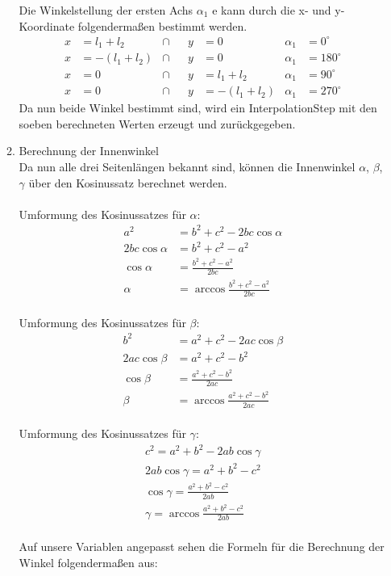 \begin{itemize}
\begin{enumerate}
Die Winkelstellung der ersten Achs $\alpha_1$ e kann durch die x- und y-Koordinate folgendermaßen bestimmt werden.
\begin{align*}
x & = l_1+l_2 &\cap && y & = 0 & \alpha_1 & = 0^\circ \\
x & = -(l_1+l_2) &\cap && y & = 0 & \alpha_1 & = 180^\circ \\ 
x & = 0 &\cap && y & = l_1+l_2 & \alpha_1 & = 90^\circ \\
x & = 0 &\cap && y & = -(l_1+l_2) & \alpha_1 & = 270^\circ
\end{align*}
Da nun beide Winkel bestimmt sind, wird ein InterpolationStep mit den soeben berechneten Werten erzeugt und zurückgegeben.
\item Berechnung der Innenwinkel\\
Da nun alle drei Seitenlängen bekannt sind, können die Innenwinkel $\alpha$, $\beta$, $\gamma$ über den Kosinussatz berechnet werden.\\
\\
Umformung des Kosinussatzes für $\alpha$:
\begin{align*}
a^2 & = b^2 + c^2 - 2bc \cos \alpha \\
2bc \cos \alpha & = b^2 + c^2 - a^2 \\
\cos \alpha & = \frac{b^2 + c^2 - a^2}{2bc} \\
\alpha & = \arccos \frac{b^2 + c^2 - a^2}{2bc}
\end{align*}
\\
Umformung des Kosinussatzes für $\beta$:
\begin{align*}
b^2 & = a^2 + c^2 - 2ac \cos \beta \\
2ac \cos \beta & = a^2 + c^2 - b^2 \\
\cos \beta & = \frac{a^2 + c^2 - b^2}{2ac} \\
\beta & = \arccos \frac{a^2 + c^2 - b^2}{2ac}
\end{align*}
\\
Umformung des Kosinussatzes für $\gamma$:
\begin{align*}
c^2 = a^2 + b^2 - 2ab \cos \gamma \\
2ab \cos \gamma = a^2 + b^2 - c^2 \\
\cos \gamma = \frac{a^2 + b^2 - c^2}{2ab} \\
\gamma = \arccos \frac{a^2 + b^2 - c^2}{2ab}
\end{align*}
\\
Auf unsere Variablen angepasst sehen die Formeln für die Berechnung der Winkel folgendermaßen aus:
\begin{align*}

\end{align*}
\end{enumerate}
\end{itemize}
